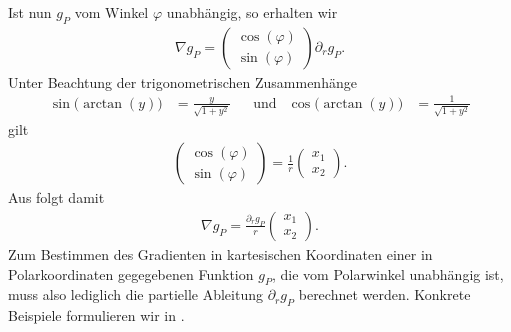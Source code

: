 Ist nun $g_P$ vom Winkel $\varphi$ unabhängig, so erhalten wir
\begin{align}
  \label{eq:gradInPolarCoordinates}
  \nabla g_P 
  = 
  \begin{pmatrix}
    \cos(\varphi)\\
    \sin(\varphi)
  \end{pmatrix}
  \partial_r g_P.
\end{align}
Unter Beachtung der trigonometrischen Zusammenhänge
\begin{align*}
  \sin\big(\arctan(y)\big) &= \frac{y}{\sqrt{1+y^2}} &&\text{und}
  &\cos\big(\arctan(y)\big) &= \frac{1}{\sqrt{1+y^2}}
\end{align*}
gilt
\begin{align*}
  \begin{pmatrix}
    \cos(\varphi)\\
    \sin(\varphi)
  \end{pmatrix}
  = 
  \frac{1}{r}
  \begin{pmatrix}
    x_1\\
    x_2
  \end{pmatrix}.
\end{align*}
Aus  folgt damit
\begin{align*}
  \nabla g_P
  = 
  \frac{\partial_r g_P}{r}
  \begin{pmatrix}
    x_1\\
    x_2
  \end{pmatrix}.
\end{align*} 
Zum Bestimmen des Gradienten in kartesischen Koordinaten einer
in Polarkoordinaten gegegebenen Funktion $g_P$, die
vom Polarwinkel unabhängig ist, muss also lediglich 
die partielle Ableitung $\partial_r g_P$ berechnet werden.
Konkrete Beispiele formulieren wir in .
